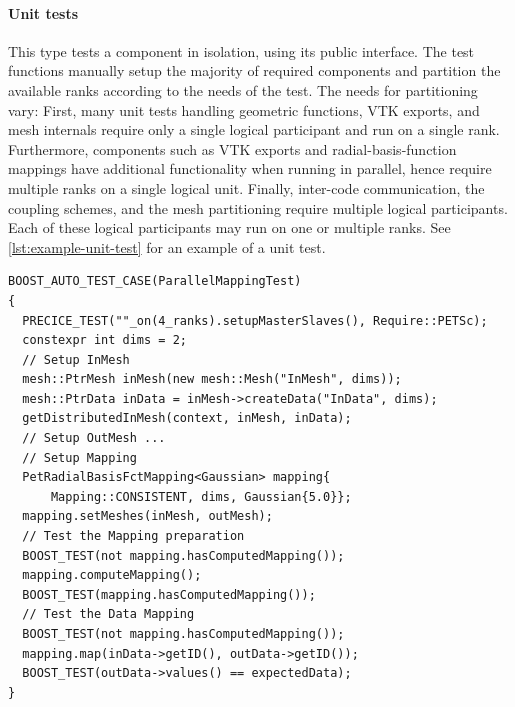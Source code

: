 \paragraph{Unit tests} This type tests a component in isolation, using its public interface.
The test functions manually setup the majority of required components and partition the available ranks according to the needs of the test.
The needs for partitioning vary:
First, many unit tests handling geometric functions, VTK exports, and mesh internals require only a single logical participant and run on a single rank.
Furthermore, components such as VTK exports and radial-basis-function mappings have additional functionality when running in parallel, hence require multiple ranks on a single logical unit.
Finally, inter-code communication, the coupling schemes, and the mesh partitioning require multiple logical participants.
Each of these logical participants may run on one or multiple ranks.
See \autoref{lst:example-unit-test} for an example of a unit test.

\begin{listing}[h!]
  \centering
\begin{minipage}{0.85\linewidth}
\begin{verbatim}
BOOST_AUTO_TEST_CASE(ParallelMappingTest)
{
  PRECICE_TEST(""_on(4_ranks).setupMasterSlaves(), Require::PETSc);
  constexpr int dims = 2;
  // Setup InMesh
  mesh::PtrMesh inMesh(new mesh::Mesh("InMesh", dims));
  mesh::PtrData inData = inMesh->createData("InData", dims);
  getDistributedInMesh(context, inMesh, inData);
  // Setup OutMesh ...
  // Setup Mapping
  PetRadialBasisFctMapping<Gaussian> mapping{
      Mapping::CONSISTENT, dims, Gaussian{5.0}};
  mapping.setMeshes(inMesh, outMesh);
  // Test the Mapping preparation
  BOOST_TEST(not mapping.hasComputedMapping());
  mapping.computeMapping();
  BOOST_TEST(mapping.hasComputedMapping());
  // Test the Data Mapping
  BOOST_TEST(not mapping.hasComputedMapping());
  mapping.map(inData->getID(), outData->getID());
  BOOST_TEST(outData->values() == expectedData);
}
\end{verbatim}
\end{minipage}
\caption{%
Example unit test of a parallel RBF mapping running on 4 ranks.
Further requirements on the test are the setup of the master-slave communication and the initialization of PETSc.
First the test defines meshes and associated data followed by setting up and executing the mapping.
The result is the checked against the expected outcome.
The example showcases the preparation involved in testing individual components of preCICE in a parallel context.
}
\label{lst:example-unit-test}
\end{listing}

